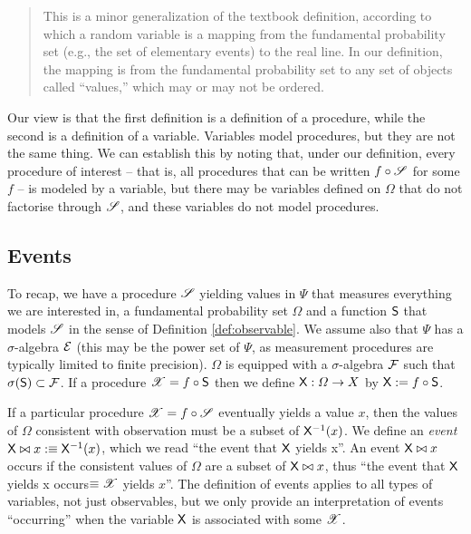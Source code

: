 \begin{quote}
This is a minor generalization of the textbook definition, according to which a random variable is a mapping from the fundamental probability set (e.g., the set of elementary events) to the real line. In our definition, the mapping is from the fundamental probability set to any set of objects called ``values,'' which may or may not be ordered.
\end{quote}

Our view is that the first definition is a definition of a procedure, while the second is a definition of a variable. Variables model procedures, but they are not the same thing. We can establish this by noting that, under our definition, every procedure of interest -- that is, all procedures that can be written $f\circ \mathscr{S}$ for some $f$ -- is modeled by a variable, but there may be variables defined on $\Omega$ that do not factorise through $\mathscr{S}$, and these variables do not model procedures.

\subsection{Events}

To recap, we have a procedure $\mathscr{S}$ yielding values in $\Psi$ that measures everything we are interested in, a fundamental probability set $\Omega$ and a function $\mathsf{S}$ that models $\mathscr{S}$ in the sense of Definition \ref{def:observable}. We assume also that $\Psi$ has a $\sigma$-algebra $\mathcal{E}$ (this may be the power set of $\Psi$, as measurement procedures are typically limited to finite precision). $\Omega$ is equipped with a $\sigma$-algebra $\mathcal{F}$ such that $\sigma(\mathsf{S})\subset \mathcal{F}$. If a procedure $\mathscr{X}=f\circ \mathsf{S}$ then we define $\mathsf{X}:\Omega\to X$ by $\mathsf{X}:=f\circ\mathsf{S}$.

If a particular procedure $\mathscr{X}=f\circ \mathscr{S}$ eventually yields a value $x$, then the values of $\Omega$ consistent with observation must be a subset of $\mathsf{X}^{-1}(x)$. We define an \emph{event} $\mathsf{X}\bowtie x:\equiv \mathsf{X}^{-1}(x)$, which we read ``the event that $\mathsf{X}$ yields x''. An event $\mathsf{X}\bowtie x$ occurs if the consistent values of $\Omega$ are a subset of $\mathsf{X}\bowtie x$, thus ``the event that $\mathsf{X}$ yields x occurs$\equiv \mathscr{X}$ yields $x$''. The definition of events applies to all types of variables, not just observables, but we only provide an interpretation of events ``occurring'' when the variable $\mathsf{X}$ is associated with some $\mathscr{X}$.

